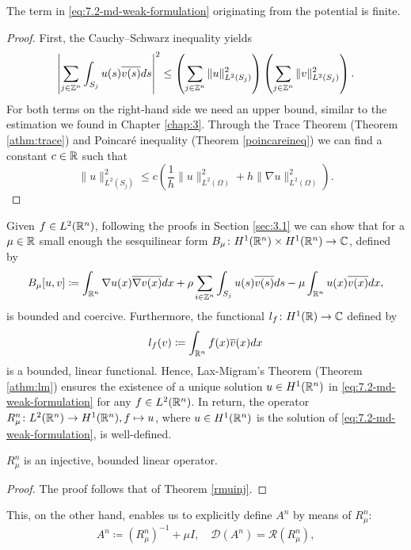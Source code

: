 \begin{remark} 
	The term in \eqref{eq:7.2-md-weak-formulation} originating from the potential is finite.
	
	\begin{proof}
	 First, the Cauchy–Schwarz inequality yields
	\[ \left| \sum_{j \in \mathbb{Z}^{n}} \int_{S_{j}} u(s) \overline{v(s)} ds \right|^{2} \leq \left( \sum_{j \in \mathbb{Z}^{n}} \| u \|_{L^{2}(S_{j})}^{2} \right) \left( \sum_{j \in \mathbb{Z}^{n}} \| v \|_{L^{2}(S_{j})}^{2} \right). \] 
	For both terms on the right-hand side we need an upper bound, similar to the estimation we found in Chapter \ref{chap:3}. Through the Trace Theorem (Theorem \ref{athm:trace}) and Poincaré inequality (Theorem \ref{poincareineq}) we can find a constant $c \in \mathbb{R}$ such that
	\[ \| u \|_{L^{2}(S_{j})}^{2} \leq c \left( \frac{1}{h} \|u\|_{L^{2}(\Omega)}^{2} + h \| \nabla u \|_{L^{2}(\Omega)}^{2} \right). \]	\vspace{-0.5cm}
	\end{proof}
\end{remark}

Given $f \in L^{2}(\mathbb{R}^{n})$, following the proofs in Section \ref{sec:3.1} we can show that for a $\mu \in \mathbb{R}$ small enough the sesquilinear form $B_{\mu} \colon H^{1}(\mathbb{R}^{n}) \times H^{1}(\mathbb{R}^{n}) \rightarrow \mathbb{C}$, defined by
\[ B_{\mu}[u, v] \coloneqq \int_{\mathbb{R}^{n}} \nabla u(x) \overline{\nabla v(x)} dx + \rho \sum_{i \in \mathbb{Z}^{n}} \int_{S_{j}} u(s) \overline{v(s)} ds - \mu \int_{\mathbb{R}^{n}} u(x) \overline{v(x)} dx, \]
 is  bounded and coercive. Furthermore, the functional $l_{f} \colon H^{1}(\mathbb{R}) \rightarrow \mathbb{C}$ defined by
	\[ l_{f}(v) \coloneqq \int_{\mathbb{R}^{n}} f(x) \overline{v}(x) dx \]
is a bounded, linear functional. Hence, Lax-Migram's Theorem (Theorem \ref{athm:lm}) ensures the existence of a unique solution $u \in H^{1}(\mathbb{R}^{n})$ in \eqref{eq:7.2-md-weak-formulation} for any $f \in L^{2}(\mathbb{R}^{n})$. In return, the operator $R_{\mu}^{n} \colon L^{2}(\mathbb{R}^{n}) \rightarrow H^{1}(\mathbb{R}^{n}), f \mapsto u$, where $u \in H^{1}(\mathbb{R}^{n})$ is the solution of \eqref{eq:7.2-md-weak-formulation}, is well-defined. 

\begin{theorem} 
	$R_{\mu}^{n}$ is an injective, bounded linear operator.  
	
	\begin{proof}
		The proof follows that of Theorem \ref{rmuinj}.
	\end{proof}
\end{theorem}

This, on the other hand, enables us to explicitly define $A^{n}$ by means of $R_{\mu}^{n}$:
\[ A^{n} \coloneqq \left(R_{\mu}^{n}\right)^{-1} + \mu I, \quad \mathcal{D}(A^{n}) = \mathcal{R}(R_{\mu}^{n}), \]

